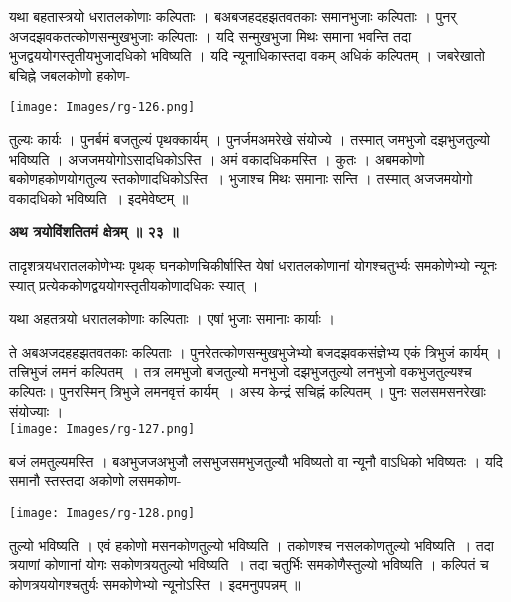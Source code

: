\documentclass[11pt, openany]{book}
\begin{document}
 यथा बहतास्त्रयो धरातलकोणाः कल्पिताः । बअबजहदहझतवतकाः समानभुजाः कल्पिताः । पुनर् अजदझवकतत्कोणसन्मुखभुजाः कल्पिताः । यदि सन्मुखभुजा मिथः समाना भवन्ति तदा भुजद्वययोगस्तृतीयभुजादधिको भविष्यति । यदि न्यूनाधिकास्तदा वकम् अधिकं कल्पितम् । जबरेखातो बचिह्ने जबलकोणो हकोण-
 \begin{center}
 \texttt{[image: Images/rg-126.png]}
 \end{center}
\noindent तुल्यः कार्यः । पुनर्बमं बजतुल्यं पृथक्कार्यम् । पुनर्जमअमरेखे संयोज्ये । तस्मात् जमभुजो दझभुजतुल्यो भविष्यति । अजजमयोगोऽसादधिकोऽस्ति । अमं वकादधिकमस्ति । कुतः । अबमकोणो बकोणहकोणयोगतुल्य स्तकोणादधिकोऽस्ति~। भुजाश्च मिथः समानाः सन्ति । तस्मात् अजजमयोगो वकादधिको भविष्यति~। इदमेवेष्टम् ॥\\
\begin{center}
\textbf{अथ त्रयोविंशतितमं क्षेत्रम् ॥ २३ ॥}
\end{center}
\vspace{5mm}

{\ab तादृशत्रयधरातलकोणेभ्यः पृथक् घनकोणचिकीर्षास्ति येषां धरातलकोणानां योगश्चतुर्भ्यः समकोणेभ्यो न्यूनः स्यात् प्रत्येककोणद्वययोगस्तृतीयकोणादधिकः स्यात् ।}

\newpage
यथा अहतत्रयो धरातलकोणाः कल्पिताः । एषां भुजाः समानाः
कार्याः ।

 \begin{vwcol}[widths={0.65,0.35}, sep=.8cm, rule=0pt]
ते अबअजदहहझतवतकाः कल्पिताः । पुनरेतत्कोणसन्मुखभुजेभ्यो बजदझवकसंज्ञेभ्य एकं त्रिभुजं कार्यम् । तत्त्रिभुजं लमनं कल्पितम्~। तत्र लमभुजो बजतुल्यो मनभुजो दझभुजतुल्यो लनभुजो वकभुजतुल्यश्च कल्पितः। पुनरस्मिन् त्रिभुजे लमनवृत्तं कार्यम्~। अस्य केन्द्रं सचिह्नं कल्पितम् । पुनः सलसमसनरेखाः संयोज्याः ।\\
 \texttt{[image: Images/rg-127.png]}
 \end{vwcol}
 \vspace{-7mm}
 
 \noindent बजं लमतुल्यमस्ति । बअभुजजअभुजौ लसभुजसमभुजतुल्यौ भविष्यतो वा न्यूनौ वाऽधिको भविष्यतः । यदि समानौ स्तस्तदा अकोणो लसमकोण-
\begin{center}
\texttt{[image: Images/rg-128.png]}
\end{center}
तुल्यो भविष्यति । एवं हकोणो मसनकोणतुल्यो भविष्यति । तकोणश्च नसलकोणतुल्यो भविष्यति~। तदा त्रयाणां कोणानां योगः सकोणत्रयतुल्यो भविष्यति~। तदा चतुर्भिः समकोणैस्तुल्यो भविष्यति । कल्पितं च कोणत्रययोगश्चतुर्यः समकोणेभ्यो न्यूनोऽस्ति । इदमनुपपन्नम् ॥\\
\vspace{5mm}
\end{document}
